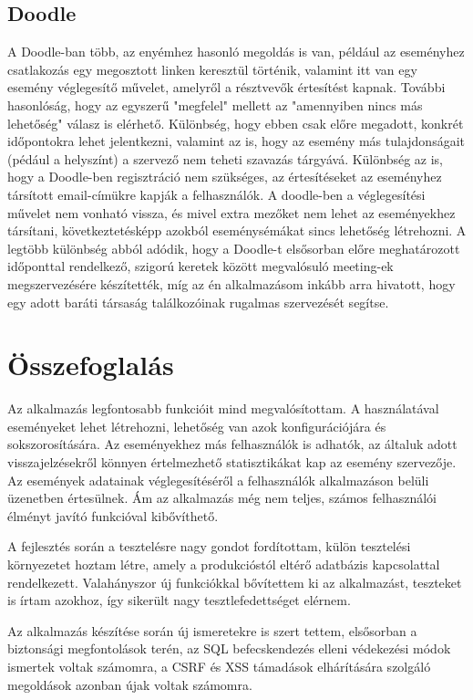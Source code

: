 \documentclass[a4paper,12pt]{report}
\theoremstyle{definition}
\theoremstyle{remark}
\begin{document}
\section{Doodle}

A Doodle-ban több, az enyémhez hasonló megoldás is van, például az eseményhez csatlakozás egy megosztott linken keresztül történik, valamint itt van egy esemény véglegesítő művelet, amelyről a résztvevők értesítést kapnak.  További hasonlóság, hogy az egyszerű "megfelel" mellett az "amennyiben nincs más lehetőség" válasz is elérhető. Különbség, hogy ebben csak előre megadott, konkrét időpontokra lehet jelentkezni, valamint az is, hogy az esemény más tulajdonságait (pédául a helyszínt) a szervező nem teheti szavazás tárgyává. Különbség az is, hogy a Doodle-ben regisztráció nem szükséges, az értesítéseket az eseményhez társított email-címükre kapják a felhasználók. A doodle-ben a véglegesítési művelet nem vonható vissza, és mivel extra mezőket nem lehet az eseményekhez társítani, következtetésképp azokból eseménysémákat sincs lehetőség létrehozni. A legtöbb különbség abból adódik, hogy a Doodle-t elsősorban előre meghatározott időponttal rendelkező, szigorú keretek között megvalósuló meeting-ek megszervezésére készítették, míg az én alkalmazásom inkább arra hivatott, hogy egy adott baráti társaság találkozóinak rugalmas szervezését segítse.

\chapter{Összefoglalás}

Az alkalmazás legfontosabb funkcióit mind megvalósítottam. A használatával eseményeket lehet létrehozni, lehetőség van azok konfigurációjára és sokszorosítására. Az eseményekhez más felhasználók is adhatók, az általuk adott visszajelzésekről könnyen értelmezhető statisztikákat kap az esemény szervezője. Az események adatainak véglegesítéséről a felhasználók alkalmazáson belüli üzenetben értesülnek. Ám az alkalmazás még nem teljes, számos felhasználói élményt javító funkcióval kibővíthető.

A fejlesztés során a tesztelésre nagy gondot fordítottam, külön tesztelési környezetet hoztam létre, amely a produkcióstól eltérő adatbázis kapcsolattal rendelkezett. Valahányszor új funkciókkal bővítettem ki az alkalmazást, teszteket is írtam azokhoz, így sikerült nagy tesztlefedettséget elérnem.

Az alkalmazás készítése során új ismeretekre is szert tettem, elsősorban a biztonsági megfontolások terén, az SQL befecskendezés elleni védekezési módok ismertek voltak számomra, a CSRF és XSS támadások elhárítására szolgáló megoldások azonban újak voltak számomra.
\end{document}
